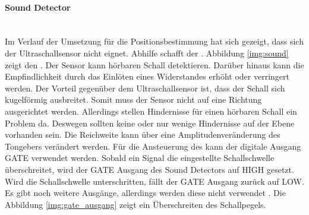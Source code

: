 \paragraph{Sound Detector}\mbox{}\\
Im Verlauf der Umsetzung für die Positionsbestimmung hat sich gezeigt, dass sich der Ultraschallsensor \ultraschall \platz nicht eignet. Abhilfe schafft der \microphone. Abbildung \ref{img:sound} zeigt den \microphone. Der Sensor kann hörbaren Schall detektieren. Darüber hinaus kann die Empfindlichkeit durch das Einlöten eines Widerstandes erhöht oder verringert werden. Der Vorteil gegenüber dem Ultraschallsensor ist, dass der Schall sich kugelförmig ausbreitet. Somit muss der Sensor nicht auf eine Richtung ausgerichtet werden. Allerdings stellen Hindernisse für einen hörbaren Schall ein Problem da. Deswegen sollten keine oder nur wenige Hindernisse auf der Ebene vorhanden sein. Die Reichweite kann über eine Amplitudenveränderung des Tongebers verändert werden. Für die Ansteuerung des \microphone \platz kann der digitale Ausgang \si{GATE} verwendet werden. Sobald ein Signal die eingestellte Schallschwelle überschreitet, wird der \si{GATE} Ausgang des Sound Detectors auf \si{HIGH} gesetzt. Wird die Schallschwelle unterschritten, fällt der \si{GATE} Ausgang zurück auf \si{LOW}. Es gibt noch weitere Ausgänge, allerdings werden diese nicht verwendet \cite{src_SOUND_DETECTOR}. Die Abbildung \ref{img:gate_ausgang} zeigt ein Überschreiten des Schallpegels.

